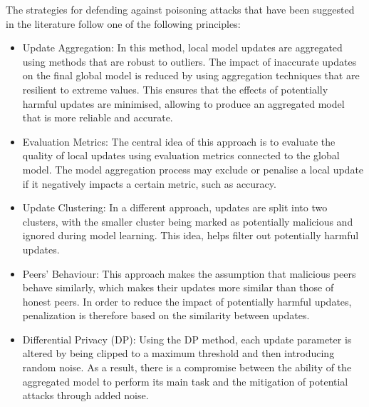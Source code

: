 The strategies for defending against poisoning attacks that have been suggested in the literature follow one of the following principles:
\begin{itemize}
        \item Update Aggregation: In this method, local model updates are aggregated using methods that are robust to outliers. The impact of inaccurate updates on the final global model is reduced by using aggregation techniques that are resilient to extreme values. This ensures that the effects of potentially harmful updates are minimised, allowing to produce an aggregated model that is more reliable and accurate.
        \item Evaluation Metrics: The central idea of this approach is to evaluate the quality of local updates using evaluation metrics connected to the global model. The model aggregation process may exclude or penalise a local update if it negatively impacts a certain metric, such as accuracy.
        \item Update Clustering: In a different approach, updates are split into two clusters, with the smaller cluster being marked as potentially malicious and ignored during model learning. This idea, helps filter out potentially harmful updates.
        \item Peers' Behaviour: This approach makes the assumption that malicious peers behave similarly, which makes their updates more similar than those of honest peers. In order to reduce the impact of potentially harmful updates, penalization is therefore based on the similarity between updates.
        \item Differential Privacy (DP): Using the DP method, each update parameter is altered by being clipped to a maximum threshold and then introducing random noise. As a result, there is a compromise between the ability of the aggregated model to perform its main task and the mitigation of potential attacks through added noise.
\end{itemize}

